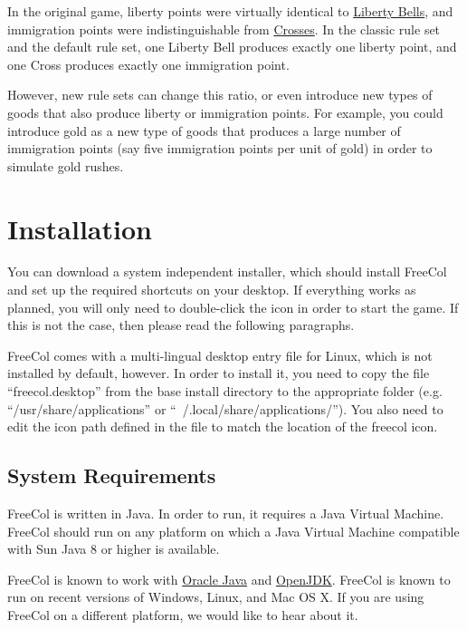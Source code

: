 \documentclass[12pt]{book}
\begin{document}
In the original game, liberty points were virtually identical to
\hyperlink{Liberty Bells}{Liberty Bells}, and immigration points were
indistinguishable from \hyperlink{Crosses}{Crosses}. In the classic
rule set and the default rule set, one Liberty Bell produces exactly
one liberty point, and one Cross produces exactly one immigration
point.

However, new rule sets can change this ratio, or even introduce new
types of goods that also produce liberty or immigration points. For
example, you could introduce gold as a new type of goods that produces
a large number of immigration points (say five immigration points per
unit of gold) in order to simulate gold rushes.



\hypertarget{Installation}{\chapter{Installation}}

You can download a system independent installer, which should install
FreeCol and set up the required shortcuts on your desktop. If
everything works as planned, you will only need to double-click the
icon in order to start the game. If this is not the case, then please
read the following paragraphs.

FreeCol comes with a multi-lingual desktop entry file for Linux, which
is not installed by default, however. In order to install it, you need
to copy the file ``freecol.desktop'' from the base install directory
to the appropriate folder (e.g. ``/usr/share/applications'' or
``~/.local/share/applications/''). You also need to edit the icon path
defined in the file to match the location of the freecol icon.


\hypertarget{System Requirements}{\section{System Requirements}}

FreeCol is written in Java. In order to run, it requires a Java
Virtual Machine. FreeCol should run on any platform on which a Java
Virtual Machine compatible with Sun Java 8 or higher is available.

FreeCol is known to work with \href{http://java.sun.com/}{Oracle Java}
and \href{http://openjdk.java.net}{OpenJDK}. FreeCol is known to run on
recent versions of Windows, Linux, and Mac OS X. If you are using
FreeCol on a different platform, we would like to hear about it.
\end{document}
